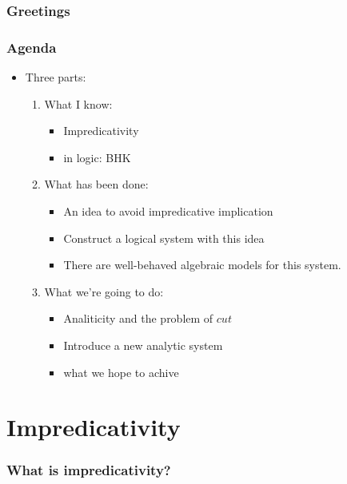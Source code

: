 \documentclass{paper}
\begin{document}
\setcounter{section}{-1}
\section{Greetings}
\section{Agenda}
\begin{itemize}
  \item Three parts:
    \begin{enumerate}
      \item What I know:
        \begin{itemize}
          \item Impredicativity
          \item in logic: BHK
        \end{itemize}
      \item What has been done:
        \begin{itemize}
          \item An idea to avoid impredicative implication
          \item Construct a logical system with this idea
          \item There are well-behaved algebraic models for this system.
        \end{itemize}
      \item What we're going to do:
        \begin{itemize}
          \item Analiticity and the problem of $cut$
          \item Introduce a new analytic system
          \item what we hope to achive
        \end{itemize}
    \end{enumerate}
\end{itemize}
\part{Impredicativity}
\section{What is impredicativity?}
\end{document}
